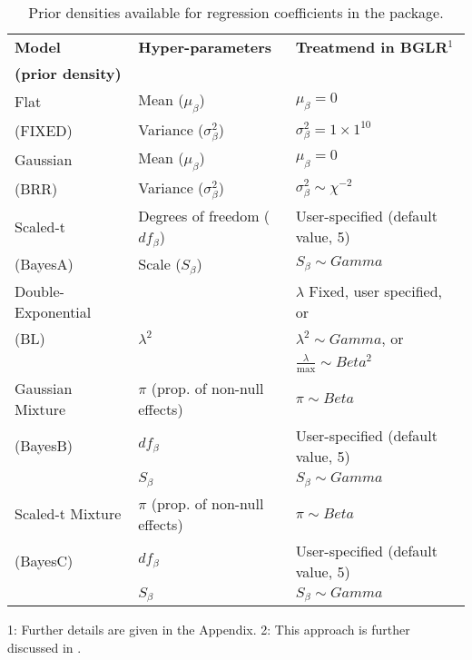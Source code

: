 \documentclass[article,shortnames,nojss]{jss}
\begin{document}
\begin{table}[!htb]
  \caption{Prior densities available for regression coefficients in the  package.}
  \begin{center}
  \begin{tabular}{lll}
  \hline
  \textbf{Model}                        & \textbf{Hyper-parameters}  & \textbf{Treatmend in BGLR}$^1$ \\
  \textbf{(prior density)}              &                            & \\
  \hline
  Flat                                 & Mean ($\mu_\beta$)         & $\mu_\beta=0$ \\
  (FIXED)                                & Variance ($\sigma_\beta^2$)& $\sigma_\beta^2=1 \times 1^{10}$\\
  \hline
  Gaussian                                & Mean ($\mu_\beta$)         & $\mu_\beta=0$ \\
  (BRR)                            & Variance ($\sigma_\beta^2$)& $\sigma_\beta^2 \sim \chi^{-2}$\\
  \hline
  Scaled-t                                & Degrees of freedom ($df_\beta$) & User-specified (default value, 5) \\
  (BayesA)                            & Scale ($S_\beta$)  & $S_\beta \sim Gamma$\\
  \hline
   Double-Exponential                               &                            & $\lambda$ Fixed, user specified, or \\
    (BL)                                & $\lambda^2$  & $\lambda^2 \sim Gamma$, or      \\
                                        &                            & $\frac{\lambda}{\max} \sim Beta ^2$ \\                                        
  \hline
  Gaussian Mixture                                    &$\pi$ (prop. of non-null effects) & $\pi \sim Beta$ \\
   (BayesB)                               &$df_\beta$                       & User-specified (default value, 5) \\
                                        &$S_\beta$                        & $S_\beta \sim Gamma$ \\                                            
  \hline
   Scaled-t Mixture                                     &$\pi$ (prop. of non-null effects) & $\pi \sim Beta$ \\
   (BayesC)                               &$df_\beta$                       & User-specified (default value, 5) \\
                                        &$S_\beta$                        & $S_\beta \sim Gamma$ \\     
  \hline
  \end{tabular}
  \end{center}
  1: Further details are given in the Appendix. 2: This approach is further discussed in 
  \cite{delosCampos:2009a}.
  \label{tab:priors_marker_effects}
\end{table}
\end{document}
